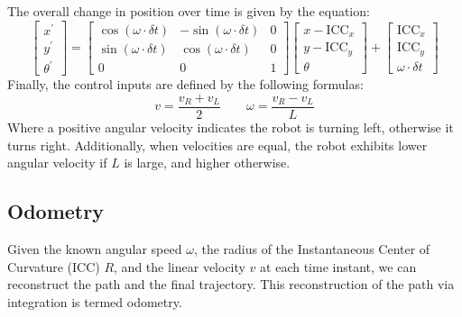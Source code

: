 The overall change in position over time is given by the equation:
\[\begin{bmatrix}
    x^\prime \\ 
    y^\prime \\
    \theta^\prime
\end{bmatrix} = 
\begin{bmatrix}
    \cos(\omega \cdot \delta t) & -\sin(\omega \cdot \delta t) & 0 \\
    \sin(\omega \cdot \delta t) & \cos(\omega \cdot \delta t) & 0 \\
    0 & 0 & 1
\end{bmatrix} \begin{bmatrix}
    x-\text{ICC}_x \\
    y-\text{ICC}_y \\
    \theta
\end{bmatrix} + \begin{bmatrix}
    \text{ICC}_x \\
    \text{ICC}_y \\
    \omega \cdot \delta t
\end{bmatrix}\]
Finally, the control inputs are defined by the following formulas:
\[v=\dfrac{v_R+v_L}{2} \qquad \omega =\dfrac{v_R-v_L}{L}\]
Where a positive angular velocity indicates the robot is turning left, otherwise it turns right. 
Additionally, when velocities are equal, the robot exhibits lower angular velocity if $L$ is large, and higher otherwise.

\subsection{Odometry}
Given the known angular speed $\omega$, the radius of the Instantaneous Center of Curvature (ICC) $R$, and the linear velocity $v$ at each time instant, we can reconstruct the path and the final trajectory.
This reconstruction of the path via integration is termed odometry.

